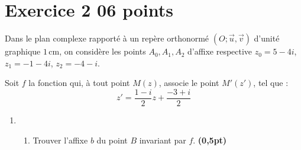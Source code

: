 \documentclass[12pt,a4paper]{article}
\begin{document}
\renewcommand{\arraystretch}{1.5}
\renewcommand{\arrayrulewidth}{1.2pt}
\vspace{3cm}

\section*{Exercice 2 \hfill 06 points}

Dans le plan complexe rapporté à un repère orthonormé \( (O ; \vec{u}, \vec{v}) \) d’unité graphique \( 1\,\text{cm} \), on considère les points \( A_0, A_1, A_2 \) d’affixe respective \( z_0 = 5 - 4i \), \( z_1 = -1 - 4i \), \( z_2 = -4 - i \).

Soit \( f \) la fonction qui, à tout point \( M(z) \), associe le point \( M'(z') \), tel que :
\[
z' = \frac{1 - i}{2} z + \frac{-3 + i}{2}
\]

\begin{enumerate}
    \item 
    \begin{enumerate}
        \item Trouver l’affixe \( b \) du point \( B \) invariant par \( f \). \hfill \textbf{(0,5pt)}
    \end{enumerate}

\end{enumerate}
\end{document}
